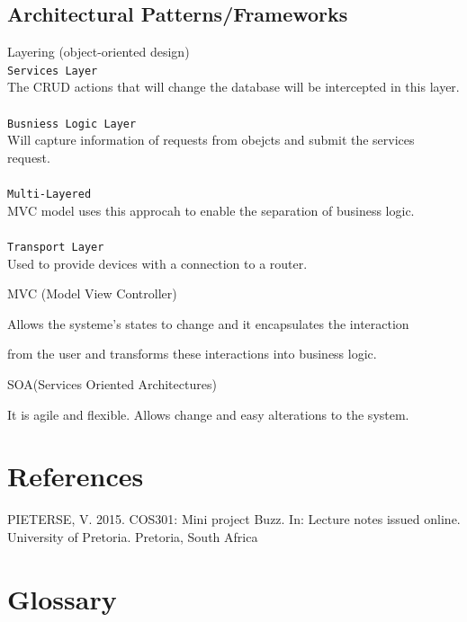 \documentclass[a4paper,12pt]{report}
\begin{document}
\subsection{Architectural Patterns/Frameworks}
	\begin{description}
\item[$\bullet$] Layering (object-oriented design)
\\ \texttt{Services Layer}\\
The CRUD actions that will change the database will be intercepted in this layer.\\
\\ \texttt{Busniess Logic Layer}\\
Will capture information of requests from obejcts and submit the services request.\\
\\ \texttt{Multi-Layered}\\
MVC model uses this approcah to enable the separation of business logic.\\
\\ \texttt{Transport Layer}\\
Used to provide devices with a connection to a router.
\item[$\bullet$] MVC (Model View Controller)
\item Allows the systeme's  states to change and it encapsulates the interaction
\item from the user  and transforms these interactions into business logic.
\item[$\bullet$] SOA(Services Oriented Architectures)
\item It is agile and flexible. Allows change and easy alterations to the system.
\end{description}
\section{References}
PIETERSE, V. 2015. COS301: Mini project Buzz. In: Lecture notes issued online. University of Pretoria. Pretoria, South Africa

\section{Glossary}
\end{document}
